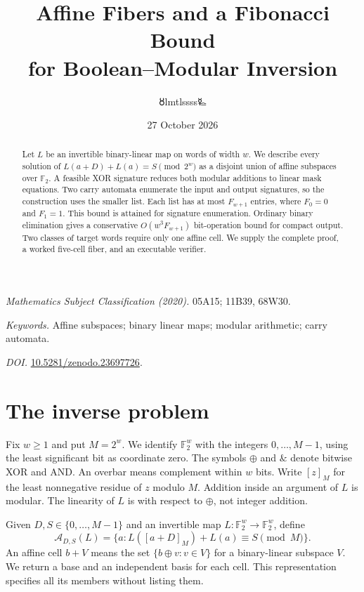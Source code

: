 \documentclass[11pt,a4paper]{article}
\title{\LARGE Affine Fibers and a Fibonacci Bound\\for Boolean--Modular Inversion}
\author{{\authorsymbol 🜘}lmtlssss{\authorsymbol 🜐}}
\date{27 October 2026}
\theoremstyle{definition}\newtheorem{definition}[theorem]{Definition}
\newcommand{\F}{\mathbb F_2}
\newcommand{\andb}{\mathbin{\&}}
\newcommand{\res}[1]{[#1]_M}
\begin{document}
\maketitle\thispagestyle{plain}
\begin{abstract}
Let $L$ be an invertible binary-linear map on words of width $w$.
We describe every solution of $L(a+D)+L(a)=S\pmod{2^w}$ as a disjoint
union of affine subspaces over $\F$. A feasible XOR signature reduces both
modular additions to linear mask equations. Two carry automata enumerate
the input and output signatures, so the construction uses the smaller
list. Each list has at most $F_{w+1}$ entries, where $F_0=0$ and $F_1=1$.
This bound is attained for signature enumeration. Ordinary binary
elimination gives a conservative $O(w^3F_{w+1})$ bit-operation bound for
compact output. Two classes of target words require only one affine
cell. We supply the complete proof, a worked five-cell fiber, and an
executable verifier.
\end{abstract}
\noindent\textit{Mathematics Subject Classification (2020).}
05A15; 11B39, 68W30.\par
\noindent\textit{Keywords.} Affine subspaces; binary linear maps;
modular arithmetic; carry automata.\par
\noindent\textit{DOI.} \href{https://doi.org/10.5281/zenodo.23697726}{10.5281/zenodo.23697726}.

\section{The inverse problem}
Fix $w\geq1$ and put $M=2^w$. We identify $\F^w$ with the integers
$0,\ldots,M-1$, using the least significant bit as coordinate zero.
The symbols $\oplus$ and $\andb$ denote bitwise XOR and AND. An overbar
means complement within $w$ bits. Write $\res z$ for the least nonnegative
residue of $z$ modulo $M$. Addition inside an argument of $L$ is modular.
The linearity of $L$ is with respect to $\oplus$, not integer addition.

Given $D,S\in\{0,\ldots,M-1\}$ and an invertible map
$L:\F^w\to\F^w$, define
\begin{equation}\label{eq:fiber}
\mathcal A_{D,S}(L)=\{a:L(\res{a+D})+L(a)\equiv S\pmod M\}.
\end{equation}
An affine cell $b+V$ means the set $\{b\oplus v:v\in V\}$ for a
binary-linear subspace $V$. We return a base and an independent basis
for each cell. This representation specifies all its members without
listing them.
\end{document}
